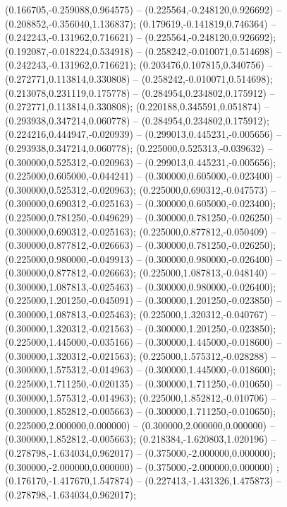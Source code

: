  (0.166705,-0.259088,0.964575) -- (0.225564,-0.248120,0.926692) -- (0.208852,-0.356040,1.136837);
 (0.179619,-0.141819,0.746364) -- (0.242243,-0.131962,0.716621) -- (0.225564,-0.248120,0.926692);
 (0.192087,-0.018224,0.534918) -- (0.258242,-0.010071,0.514698) -- (0.242243,-0.131962,0.716621);
 (0.203476,0.107815,0.340756) -- (0.272771,0.113814,0.330808) -- (0.258242,-0.010071,0.514698);
 (0.213078,0.231119,0.175778) -- (0.284954,0.234802,0.175912) -- (0.272771,0.113814,0.330808);
 (0.220188,0.345591,0.051874) -- (0.293938,0.347214,0.060778) -- (0.284954,0.234802,0.175912);
 (0.224216,0.444947,-0.020939) -- (0.299013,0.445231,-0.005656) -- (0.293938,0.347214,0.060778);
 (0.225000,0.525313,-0.039632) -- (0.300000,0.525312,-0.020963) -- (0.299013,0.445231,-0.005656);
 (0.225000,0.605000,-0.044241) -- (0.300000,0.605000,-0.023400) -- (0.300000,0.525312,-0.020963);
 (0.225000,0.690312,-0.047573) -- (0.300000,0.690312,-0.025163) -- (0.300000,0.605000,-0.023400);
 (0.225000,0.781250,-0.049629) -- (0.300000,0.781250,-0.026250) -- (0.300000,0.690312,-0.025163);
 (0.225000,0.877812,-0.050409) -- (0.300000,0.877812,-0.026663) -- (0.300000,0.781250,-0.026250);
 (0.225000,0.980000,-0.049913) -- (0.300000,0.980000,-0.026400) -- (0.300000,0.877812,-0.026663);
 (0.225000,1.087813,-0.048140) -- (0.300000,1.087813,-0.025463) -- (0.300000,0.980000,-0.026400);
 (0.225000,1.201250,-0.045091) -- (0.300000,1.201250,-0.023850) -- (0.300000,1.087813,-0.025463);
 (0.225000,1.320312,-0.040767) -- (0.300000,1.320312,-0.021563) -- (0.300000,1.201250,-0.023850);
 (0.225000,1.445000,-0.035166) -- (0.300000,1.445000,-0.018600) -- (0.300000,1.320312,-0.021563);
 (0.225000,1.575312,-0.028288) -- (0.300000,1.575312,-0.014963) -- (0.300000,1.445000,-0.018600);
 (0.225000,1.711250,-0.020135) -- (0.300000,1.711250,-0.010650) -- (0.300000,1.575312,-0.014963);
 (0.225000,1.852812,-0.010706) -- (0.300000,1.852812,-0.005663) -- (0.300000,1.711250,-0.010650);
 (0.225000,2.000000,0.000000) -- (0.300000,2.000000,0.000000) -- (0.300000,1.852812,-0.005663);
 (0.218384,-1.620803,1.020196) -- (0.278798,-1.634034,0.962017) -- (0.375000,-2.000000,0.000000);
 (0.300000,-2.000000,0.000000) -- (0.375000,-2.000000,0.000000) ;
 (0.176170,-1.417670,1.547874) -- (0.227413,-1.431326,1.475873) -- (0.278798,-1.634034,0.962017);
